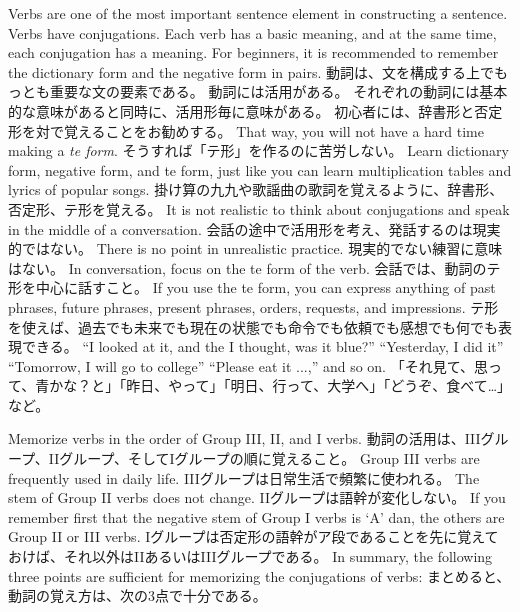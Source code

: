 \documentclass[uplatex,dvipdfmx,b5paper,english,10pt]{jsbook}
\begin{document}
\ifEnglish
Verbs are one of the most important sentence element in constructing a sentence.
Verbs have conjugations.
Each verb has a basic meaning, and at the same time, each conjugation has a meaning.
For beginners, it is recommended to remember the dictionary form and the negative form in pairs.
\else
動詞は、文を構成する上でもっとも重要な文の要素である。
動詞には活用がある。
それぞれの動詞には基本的な意味があると同時に、活用形毎に意味がある。
初心者には、辞書形と否定形を対で覚えることをお勧めする。
\fi
\ifEnglish
That way, you will not have a hard time making a {\it te form\/}.
\else
そうすれば「テ形」を作るのに苦労しない。
\fi
\ifEnglish
Learn dictionary form, negative form, and te form, just like you can learn multiplication tables and lyrics of popular songs.
\else
掛け算の九九や歌謡曲の歌詞を覚えるように、辞書形、否定形、テ形を覚える。
\fi
\ifEnglish
It is not realistic to think about conjugations and speak in the middle of a conversation.
\else
会話の途中で活用形を考え、発話するのは現実的ではない。
\fi
\ifEnglish
There is no point in unrealistic practice.
\else
現実的でない練習に意味はない。
\fi
\ifEnglish
In conversation, focus on the te form of the verb.
\else
会話では、動詞のテ形を中心に話すこと。
\fi
\ifEnglish
If you use the te form, you can express anything of past phrases, future phrases, present phrases, orders, requests, and impressions.
\else
テ形を使えば、過去でも未来でも現在の状態でも命令でも依頼でも感想でも何でも表現できる。
\fi
\ifEnglish
``I looked at it, and the I thought, was it blue?'' ``Yesterday, I did it'' ``Tomorrow, I will go to college'' ``Please eat it ...,'' and so on.
\else
「それ見て、思って、青かな？と」「昨日、やって」「明日、行って、大学へ」「どうぞ、食べて…」など。
\fi

\ifEnglish
Memorize verbs in the order of Group III, II, and I verbs.
\else
動詞の活用は、IIIグループ、IIグループ、そしてIグループの順に覚えること。
\fi
\ifEnglish
Group III verbs are frequently used in daily life.
\else
IIIグループは日常生活で頻繁に使われる。
\fi
\ifEnglish
The stem of Group II verbs does not change.
\else
IIグループは語幹が変化しない。
\fi
\ifEnglish
If you remember first that the negative stem of Group I verbs is `A' dan, the others are Group II or III verbs.
\else
Iグループは否定形の語幹がア段であることを先に覚えておけば、それ以外はIIあるいはIIIグループである。
\fi
\ifEnglish
In summary, the following three points are sufficient for memorizing the conjugations of verbs:
\else
まとめると、動詞の覚え方は、次の3点で十分である。
\fi
\end{document}
